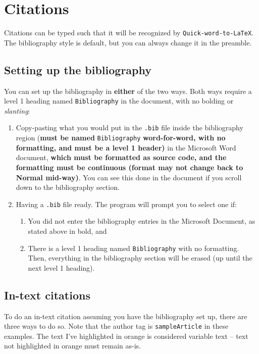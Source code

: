 \documentclass[12pt]{article}
\theoremstyle{plain}
\theoremstyle{remark}
\theoremstyle{definition}
\begin{document}
\section{Citations}

Citations can be typed such that it will be recognized by
\texttt{Quick-word-to-LaTeX}. The bibliography style is default, but you
can always change it in the preamble.


\subsection{Setting up the
bibliography}

You can set up the bibliography in \textbf{either} of the two ways. Both
ways require a level 1 heading named \texttt{Bibliography} in the
document, with no bolding or \emph{slanting}:

\begin{enumerate}
\def\labelenumi{\arabic{enumi}.}
\item
  Copy-pasting what you would put in the \texttt{.bib} file inside the
  bibliography region (\textbf{must be named} \texttt{Bibliography}
  \textbf{word-for-word, with no formatting, and must be a level 1
  header)} in the Microsoft Word document, \textbf{which must be
  formatted as source code, and the formatting must be continuous
  (format may not change back to Normal mid-way)}. You can see this done
  in the document if you scroll down to the bibliography section.
\item
  Having a \texttt{.bib} file ready. The program will prompt you to
  select one if:

  \begin{enumerate}
  \def\labelenumii{\alph{enumii}.}
  \item
    You did not enter the bibliography entries in the Microsoft
    Document, as stated above in bold, and
  \item
    There is a level 1 heading named \texttt{Bibliography} with no
    formatting. Then, everything in the bibliography section will be
    erased (up until the next level 1 heading).
  \end{enumerate}
\end{enumerate}


\subsection{In-text citations}

To do an in-text citation assuming you have the bibliography set up,
there are three ways to do so. Note that the author tag is
\texttt{sampleArticle} in these examples. The text I've highlighted in
orange is considered variable text -- text not highlighted in orange
must remain as-is.
\end{document}

